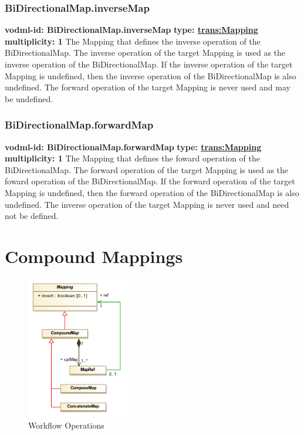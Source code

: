     \subsubsection{BiDirectionalMap.inverseMap}
      \textbf{vodml-id: BiDirectionalMap.inverseMap} \newline
      \textbf{type: \hyperref[sect:Mapping]{trans:Mapping}} \newline
      \textbf{multiplicity: 1} \newline 
      The Mapping that defines the inverse operation of the BiDirectionalMap. The inverse operation of the target Mapping is used as the inverse operation of the BiDirectionalMap. If the inverse operation of the target Mapping is undefined, then the inverse operation of the BiDirectionalMap is also undefined. The forward operation of the target Mapping is never used and may be undefined.

    \subsubsection{BiDirectionalMap.forwardMap}
      \textbf{vodml-id: BiDirectionalMap.forwardMap} \newline
      \textbf{type: \hyperref[sect:Mapping]{trans:Mapping}} \newline
      \textbf{multiplicity: 1} \newline 
      The Mapping that defines the foward operation of the BiDirectionalMap. The forward operation of the target Mapping is used as the foward operation of the BiDirectionalMap. If the forward operation of the target Mapping is undefined, then the forward operation of the BiDirectionalMap is also undefined. The inverse operation of the target Mapping is never used and need not be defined.


\pagebreak
\section{Compound Mappings}

  \begin{figure}[h]
  \begin{center}
    \includegraphics[width=1.8in]{diagrams/workflow_operations.png}
    \caption{Workflow Operations}\label{fig:WorkOps}
  \end{center}
  \end{figure}

